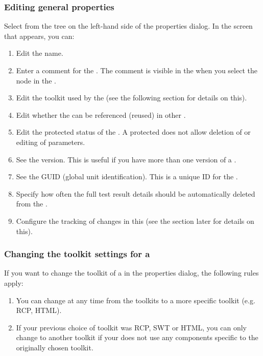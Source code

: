 \subsubsection{Editing general \gdproject{} properties}
\label{ProjPropertiesGeneral}
Select  from the tree on the left-hand side of the \gdproject{} properties dialog. In the screen that appears, you can:
\begin{enumerate}
\item Edit the \gdproject{} name. 
\item Enter a comment for the \gdproject{}. The comment is visible in the \gdpropview{} when you select the \gdproject{} node in the \gdtestsuitebrowser{}.
\item Edit the toolkit used by the \gdproject{} (see the following section  for details on this). 
\item Edit whether the \gdproject{} can be referenced (reused) in other \gdprojects{}.
\item Edit the protected status of the \gdproject{}. A protected \gdproject{} does not allow deletion of \gdcases{} or editing of parameters. 
\item See the \gdproject{} version. This is useful if you have more than one version of a \gdproject{}. 
\item See the GUID (global unit identification). This is a unique ID for the \gdproject{}. 
\item Specify how often the full test result details  should be automatically deleted from the \gddb{}.
\item Configure the tracking of changes in this \gdproject{} (see the section later  for details on this).
\end{enumerate}

\subsubsection{Changing the toolkit settings for a \gdproject{}}
\label{ProjPropertiesChangingToolkit}
If you want to change the toolkit of a \gdproject{} in the \gdproject{} properties dialog, the following rules apply:
\begin{enumerate}
\item You can change at any time from the  toolkits to a more specific toolkit (e.g. RCP, HTML). 
\item If your previous choice of toolkit was RCP, SWT or HTML, you can only change to another toolkit if your \gdproject{} does not use any components specific to the originally chosen toolkit. 
\end{enumerate}

